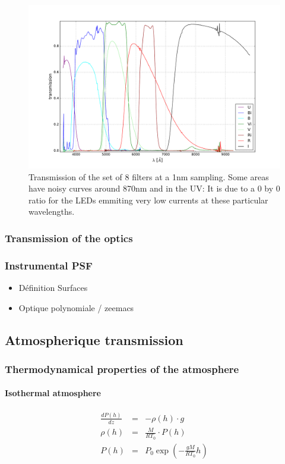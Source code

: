 \documentclass[\docopts]{\docclass}
\begin{document}
\begin{figure}[ht]
  \centering
  \includegraphics[width=0.7\linewidth]{filters_transmissions.pdf}
  \caption{Transmission of the set of 8 filters at a 1nm
    sampling. Some areas have noisy curves around 870nm and in the UV:
    It is due to a 0 by 0 ratio for the LEDs emmiting very low
    currents at these particular wavelengths.}
  \label{fig:filters_transmissions}
\end{figure}


\subsubsection{Transmission of the optics}
\label{sec:optics}

\subsubsection{Instrumental PSF}
\label{sec:PSF}
\begin{itemize}
\item Définition Surfaces
\item Optique polynomiale / zeemacs
\end{itemize}


\subsection{Atmospherique transmission}
\label{sec:atmosphere}


\subsubsection{Thermodynamical properties of the atmosphere}

\paragraph{Isothermal atmosphere}
\begin{eqnarray}
\frac{dP(h)}{dz} & = & - \rho(h) \cdot g  \nonumber \\
\rho(h)              & = & \frac{M}{RT_0}\cdot P(h) \nonumber \\
P(h)                  &=& P_0 \exp(- \frac{gM}{RT_0}h) \nonumber  
\end{eqnarray}
\end{document}
